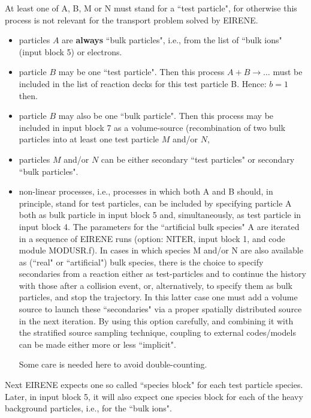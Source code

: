 At least one of A, B, M or N must stand for a ``test particle", for otherwise
this process is not relevant for the transport problem solved by EIRENE.
\begin{itemize}
  \item particles $A$ are \textbf{always} ``bulk particles", i.e., from the list
        of ``bulk ions" (input block 5) or electrons.
  \item particle $B$ may be one ``test particle".
        Then this process $A + B \rightarrow \dots$ must be included in the list of
        reaction decks for this test particle B.
        Hence: $b = 1$ then.

  \item particle $B$ may also be one ``bulk particle".
        Then this process may be included in input block 7 as a volume-source
        (recombination of two bulk particles into at least one test particle $M$ and/or
        $N$,

  \item particles $M$ and/or $N$ can be either secondary ``test particles" or
        secondary ``bulk particles".
  \item non-linear processes, i.e., processes in which both A and B should, in
        principle, stand for test particles, can be included by specifying particle A
        both as bulk particle in input block 5 and, simultaneously, as test particle in
        input block 4.
        The parameters for the ``artificial bulk species" A are iterated in a sequence
        of EIRENE runs (option: NITER, input block 1, and code module MODUSR.f).
        In cases in which species M and/or N are also available as (``real" or
        ``artificial")	 bulk species, there is the choice to specify secondaries from
        a reaction either as test-particles and to continue the history with those
        after a collision event, or, alternatively, to specify them as bulk particles,
        and stop the trajectory.
        In this latter case one must add a volume source to launch these ``secondaries"
        via a proper spatially distributed source in the next iteration.
        By using this option carefully, and combining it with the stratified source
        sampling technique, coupling to external codes/models can be made either more
        or less ``implicit".

        Some care is needed here to avoid double-counting.
\end{itemize}

Next EIRENE expects one so called ``species block" for each test particle
species.
Later, in input block 5, it will also expect one species block for each of the
heavy background particles, i.e., for the ``bulk ions".

